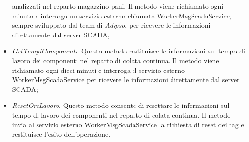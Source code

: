 \begin{itemize}
    analizzati nel reparto magazzino pani. Il metodo viene richiamato ogni minuto e interroga un servizio esterno chiamato
    WorkerMsgScadaService, sempre sviluppato dal team di \textit{Adipso}, per ricevere le informazioni direttamente dal
    server SCADA;
    \item \textit{GetTempiComponenti}. Questo metodo restituisce le informazioni sul tempo di lavoro dei componenti
    nel reparto di colata continua. Il metodo viene richiamato ogni dieci minuti e interroga il servizio esterno
    WorkerMsgScadaService per ricevere le informazioni direttamente dal server SCADA;
    \item \textit{ResetOreLavoro}. Questo metodo consente di resettare le informazioni sul tempo di lavoro dei
    componenti nel reparto di colata continua. Il metodo invia al servizio esterno WorkerMsgScadaService la richiesta
    di reset dei tag e restituisce l'esito dell'operazione.
  \end{itemize}



